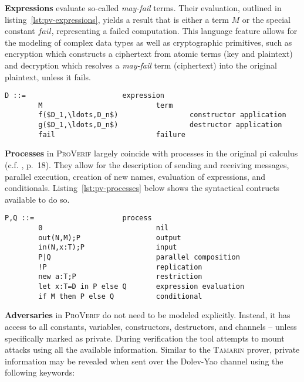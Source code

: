 \textbf{Expressions} evaluate so-called \textit{may-fail} terms.
Their evaluation, outlined in listing~\ref{lst:pv-expressions}, yields a result that is either a term $M$ or the special constant $fail$, representing a failed computation.
This language feature allows for the modeling of complex data types as well as cryptographic primitives, such as encryption which constructs a ciphertext from atomic terms (key and plaintext) and decryption which resolves a \textit{may-fail} term (ciphertext) into the original plaintext, unless it fails.

\begin{lstlisting}[caption={ProVerif expression grammar, according to \cite{blanchet2016modeling}, p.~13},label={lst:pv-expressions}]
    D ::=                       expression
        M                           term
        f($D_1,\ldots,D_n$)                 constructor application
        g($D_1,\ldots,D_n$)                 destructor application
        fail                        failure
\end{lstlisting}

\textbf{Processes} in \textsc{ProVerif} largely coincide with processes in the original pi calculus (c.f. \cite{blanchet2016modeling}, p.~18).
They allow for the description of sending and receiving messages, parallel execution, creation of new names, evaluation of expressions, and conditionals.
Listing~\ref{lst:pv-processes} below shows the syntactical contructs available to do so.

\begin{lstlisting}[caption={ProVerif process grammar, according to \cite{blanchet2016modeling}, p.~13},label={lst:pv-processes}]
    P,Q ::=                     process
        0                           nil
        out(N,M);P                  output
        in(N,x:T);P                 input
        P|Q                         parallel composition
        !P                          replication
        new a:T;P                   restriction
        let x:T=D in P else Q       expression evaluation
        if M then P else Q          conditional
\end{lstlisting}

\textbf{Adversaries} in \textsc{ProVerif} do not need to be modeled explicitly.
Instead, it has access to all constants, variables, constructors, destructors, and channels -- unless specifically marked as private.
During verification the tool attempts to mount attacks using all the available information.
Similar to the \textsc{Tamarin} prover, private information may be revealed when sent over the Dolev-Yao channel using the following keywords:

